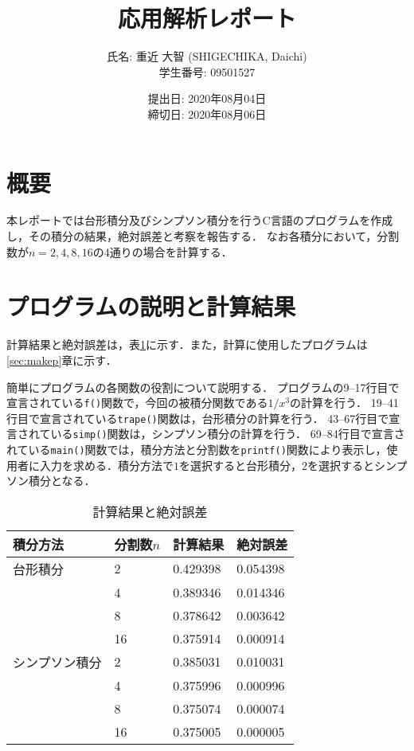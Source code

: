 \documentclass[autodetect-engine,dvi=dvipdfmx,ja=standard,
               a4j,11pt]{bxjsarticle}
\title{応用解析レポート}
\author{氏名: 重近 大智 (SHIGECHIKA, Daichi) \\
        学生番号: 09501527}
\date{提出日: 2020年08月04日 \\
      締切日: 2020年08月06日 \\}
\begin{document}
\maketitle{\footnotesize \tableofcontents \newpage}
\section{概要}
本レポートでは台形積分及びシンプソン積分を行うC言語のプログラムを作成し，その積分の結果，絶対誤差と考察を報告する．
なお各積分において，分割数が$n=2,4,8,16$の4通りの場合を計算する．

\section{プログラムの説明と計算結果}
計算結果と絶対誤差は，表\ref{tab:result}に示す．また，計算に使用したプログラムは\ref{sec:makep}章に示す．

簡単にプログラムの各関数の役割について説明する．
プログラムの9--17行目で宣言されている\verb|f()|関数で，今回の被積分関数である$1/x^3$の計算を行う．
19--41行目で宣言されている\verb|trape()|関数は，台形積分の計算を行う．
43--67行目で宣言されている\verb|simp()|関数は，シンプソン積分の計算を行う．
69--84行目で宣言されている\verb|main()|関数では，積分方法と分割数を\verb|printf()|関数により表示し，使用者に入力を求める．積分方法で$1$を選択すると台形積分，$2$を選択するとシンプソン積分となる．


\begin{table}[b]
\centering

\caption{計算結果と絶対誤差}
\label{tab:result}
\begin{tabular}{|l|l|l|l|}
\hline
積分方法 & 分割数$n$ & 計算結果 & 絶対誤差 \\
\hline
台形積分 & 2 & 0.429398 & 0.054398 \\
& 4 & 0.389346 & 0.014346 \\
& 8 & 0.378642 & 0.003642 \\
& 16 & 0.375914 & 0.000914 \\
\hline
シンプソン積分 & 2 & 0.385031 & 0.010031 \\
& 4 & 0.375996 & 0.000996 \\
& 8 & 0.375074 & 0.000074 \\
& 16 & 0.375005 & 0.000005 \\
\hline
\end{tabular}
\end{table}
\end{document}
